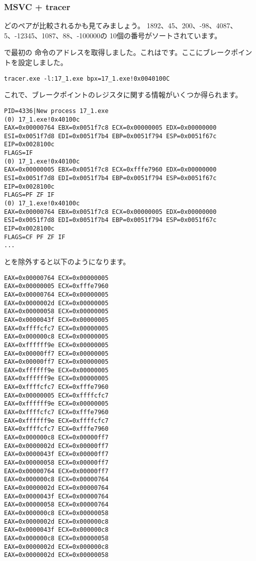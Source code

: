 \subsubsection{MSVC + tracer}

どのペアが比較されるかも見てみましょう。 
1892、45、200、-98、4087、5、-12345、1087、88、-100000の
10個の番号がソートされています。

\comp で最初の \CMP 命令のアドレスを取得しました。これはです。ここにブレークポイントを設定しました。

\begin{lstlisting}
tracer.exe -l:17_1.exe bpx=17_1.exe!0x0040100C
\end{lstlisting}

これで、ブレークポイントのレジスタに関する情報がいくつか得られます。

\begin{lstlisting}
PID=4336|New process 17_1.exe
(0) 17_1.exe!0x40100c
EAX=0x00000764 EBX=0x0051f7c8 ECX=0x00000005 EDX=0x00000000
ESI=0x0051f7d8 EDI=0x0051f7b4 EBP=0x0051f794 ESP=0x0051f67c
EIP=0x0028100c
FLAGS=IF
(0) 17_1.exe!0x40100c
EAX=0x00000005 EBX=0x0051f7c8 ECX=0xfffe7960 EDX=0x00000000
ESI=0x0051f7d8 EDI=0x0051f7b4 EBP=0x0051f794 ESP=0x0051f67c
EIP=0x0028100c
FLAGS=PF ZF IF
(0) 17_1.exe!0x40100c
EAX=0x00000764 EBX=0x0051f7c8 ECX=0x00000005 EDX=0x00000000
ESI=0x0051f7d8 EDI=0x0051f7b4 EBP=0x0051f794 ESP=0x0051f67c
EIP=0x0028100c
FLAGS=CF PF ZF IF
...
\end{lstlisting}

とを除外すると以下のようになります。

\begin{lstlisting}
EAX=0x00000764 ECX=0x00000005
EAX=0x00000005 ECX=0xfffe7960
EAX=0x00000764 ECX=0x00000005
EAX=0x0000002d ECX=0x00000005
EAX=0x00000058 ECX=0x00000005
EAX=0x0000043f ECX=0x00000005
EAX=0xffffcfc7 ECX=0x00000005
EAX=0x000000c8 ECX=0x00000005
EAX=0xffffff9e ECX=0x00000005
EAX=0x00000ff7 ECX=0x00000005
EAX=0x00000ff7 ECX=0x00000005
EAX=0xffffff9e ECX=0x00000005
EAX=0xffffff9e ECX=0x00000005
EAX=0xffffcfc7 ECX=0xfffe7960
EAX=0x00000005 ECX=0xffffcfc7
EAX=0xffffff9e ECX=0x00000005
EAX=0xffffcfc7 ECX=0xfffe7960
EAX=0xffffff9e ECX=0xffffcfc7
EAX=0xffffcfc7 ECX=0xfffe7960
EAX=0x000000c8 ECX=0x00000ff7
EAX=0x0000002d ECX=0x00000ff7
EAX=0x0000043f ECX=0x00000ff7
EAX=0x00000058 ECX=0x00000ff7
EAX=0x00000764 ECX=0x00000ff7
EAX=0x000000c8 ECX=0x00000764
EAX=0x0000002d ECX=0x00000764
EAX=0x0000043f ECX=0x00000764
EAX=0x00000058 ECX=0x00000764
EAX=0x000000c8 ECX=0x00000058
EAX=0x0000002d ECX=0x000000c8
EAX=0x0000043f ECX=0x000000c8
EAX=0x000000c8 ECX=0x00000058
EAX=0x0000002d ECX=0x000000c8
EAX=0x0000002d ECX=0x00000058
\end{lstlisting}

